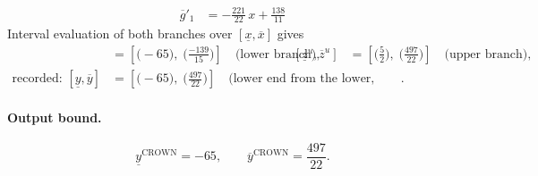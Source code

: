 \documentclass[11pt]{article}
\begin{document}
\begin{align*}
\overline{g}'_{1} &= -\frac{221}{22}\,x + \frac{138}{11}
\end{align*}
Interval evaluation of both branches over $[\underline{x}, \overline{x}]$ gives
\begin{align*}
[\underline{z}^{\ell}, \overline{z}^{\ell}] &= [\bigl(-65\bigr),\; \bigl(\frac{-139}{15}\bigr)] \quad\text{(lower branch)}, & [\underline{z}^{u}, \overline{z}^{u}] &= [\bigl(\frac{5}{2}\bigr),\; \bigl(\frac{497}{22}\bigr)] \quad\text{(upper branch)}, \\
\text{recorded: } [\underline{y}, \overline{y}] &= [\bigl(-65\bigr),\; \bigl(\frac{497}{22}\bigr)] \quad\text{(lower end from the lower, upper end from the upper branch)}.
\end{align*}
\paragraph{Output bound.}
\begin{equation*}
\underline{y}^{\text{CROWN}} = -65, \qquad \overline{y}^{\text{CROWN}} = \frac{497}{22}.
\end{equation*}
\end{document}
